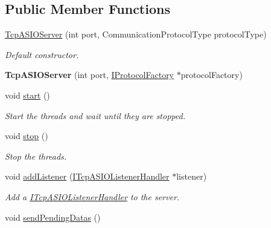 \subsection*{Public Member Functions}
\begin{DoxyCompactItemize}
\item 
\hyperlink{classmognetwork_1_1_tcp_a_s_i_o_server_a8bdf6097cf8931094d8ee7c5f5fbc4bf}{Tcp\-A\-S\-I\-O\-Server} (int port, Communication\-Protocol\-Type protocol\-Type)
\begin{DoxyCompactList}\small\item\em Default constructor. \end{DoxyCompactList}\item 
\hypertarget{classmognetwork_1_1_tcp_a_s_i_o_server_adea436db7edfd8500d60b4e06c60ea50}{{\bfseries Tcp\-A\-S\-I\-O\-Server} (int port, \hyperlink{classmognetwork_1_1_i_protocol_factory}{I\-Protocol\-Factory} $\ast$protocol\-Factory)}\label{classmognetwork_1_1_tcp_a_s_i_o_server_adea436db7edfd8500d60b4e06c60ea50}

\item 
\hypertarget{classmognetwork_1_1_tcp_a_s_i_o_server_ad6c804597aafd577c41310cdc986c7ff}{void \hyperlink{classmognetwork_1_1_tcp_a_s_i_o_server_ad6c804597aafd577c41310cdc986c7ff}{start} ()}\label{classmognetwork_1_1_tcp_a_s_i_o_server_ad6c804597aafd577c41310cdc986c7ff}

\begin{DoxyCompactList}\small\item\em Start the threads and wait until they are stopped. \end{DoxyCompactList}\item 
\hypertarget{classmognetwork_1_1_tcp_a_s_i_o_server_aa94340baa5fbbfba0f5467c6ddd32b91}{void \hyperlink{classmognetwork_1_1_tcp_a_s_i_o_server_aa94340baa5fbbfba0f5467c6ddd32b91}{stop} ()}\label{classmognetwork_1_1_tcp_a_s_i_o_server_aa94340baa5fbbfba0f5467c6ddd32b91}

\begin{DoxyCompactList}\small\item\em Stop the threads. \end{DoxyCompactList}\item 
void \hyperlink{classmognetwork_1_1_tcp_a_s_i_o_server_ac1feafc63d86a8aa90ef6a78acd7051f}{add\-Listener} (\hyperlink{classmognetwork_1_1_i_tcp_a_s_i_o_listener_handler}{I\-Tcp\-A\-S\-I\-O\-Listener\-Handler} $\ast$listener)
\begin{DoxyCompactList}\small\item\em Add a \hyperlink{classmognetwork_1_1_i_tcp_a_s_i_o_listener_handler}{I\-Tcp\-A\-S\-I\-O\-Listener\-Handler} to the server. \end{DoxyCompactList}\item 
\hypertarget{classmognetwork_1_1_tcp_a_s_i_o_server_a6627fca52b19ead79e8a7134bade9e1f}{void \hyperlink{classmognetwork_1_1_tcp_a_s_i_o_server_a6627fca52b19ead79e8a7134bade9e1f}{send\-Pending\-Datas} ()}\label{classmognetwork_1_1_tcp_a_s_i_o_server_a6627fca52b19ead79e8a7134bade9e1f}


\end{DoxyCompactItemize}
